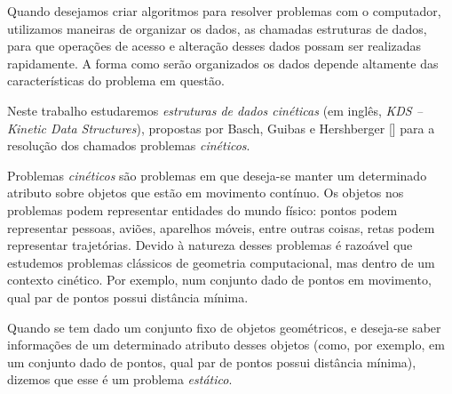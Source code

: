 

\label{cap:introducao}

\enlargethispage{.5\baselineskip}

Quando desejamos criar algoritmos para resolver problemas com o computador,
utilizamos maneiras de organizar os dados, as chamadas estruturas de dados,
para que operações de acesso e alteração desses dados possam ser realizadas
rapidamente.
A forma como serão organizados os dados depende altamente das características do
problema em questão.

Neste trabalho estudaremos \textit{estruturas de dados cinéticas} (em inglês,
\emph{KDS -- Kinetic Data Structures}), propostas por Basch, Guibas e Hershberger
[\cite{BASCH19991}] para a resolução dos chamados problemas \textit{cinéticos}.

Problemas \textit{cinéticos} são problemas em que deseja-se manter um
determinado atributo sobre objetos que estão em movimento contínuo.
Os objetos nos problemas podem representar entidades do mundo físico: pontos podem
representar pessoas, aviões, aparelhos móveis, entre outras coisas, retas podem
representar trajetórias.
Devido à natureza desses problemas é razoável que estudemos problemas clássicos de
geometria computacional, mas dentro de um contexto cinético.
Por exemplo, num conjunto dado de pontos em movimento, qual par de pontos possui
distância mínima.

Quando se tem dado um conjunto fixo de objetos geométricos, e deseja-se saber
informações de um determinado atributo desses objetos (como, por exemplo, em um
conjunto dado de pontos, qual par de pontos possui distância mínima), dizemos
que esse é um problema \textit{estático}.

